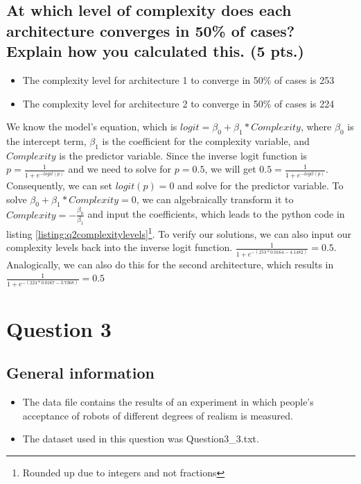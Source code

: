\documentclass[a4paper]{article}
\begin{document}
\subsection{At which level of complexity does each architecture converges in 50\% of cases? Explain how you calculated this. (5 pts.)}
\begin{itemize}
\centering
    \item The complexity level for architecture 1 to converge in 50\% of cases is 253
    \item The complexity level for architecture 2 to converge in 50\% of cases is 224
\end{itemize}
We know the model's equation, which is $logit = \beta_0 + \beta_1 * Complexity$, where $\beta_0$ is the intercept term, $\beta_1$ is the coefficient for the complexity variable, and $Complexity$ is the predictor variable. Since the inverse logit function is $p = \frac{1}{1 + e^{-logit(p)}}$ and we need to solve for $p = 0.5$, we will get $0.5 = \frac{1}{1 + e^{-logit(p)}}$. Consequently, we can set $logit(p) = 0$ and solve for the predictor variable. To solve $\beta_0 + \beta_1 * Complexity = 0$, we can algebraically transform it to $Complexity = -\frac{\beta_{0}}{\beta_{1}}$ and input the coefficients, which leads to the python code in listing \ref{listing:q2complexitylevels}\footnote{Rounded up due to integers and not fractions}. To verify our solutions, we can also input our complexity levels back into the inverse logit function. $\frac{1}{1 + e^{-(253 * 0.0164 - 4.1482)}} = 0.5$. Analogically, we can also do this for the second architecture, which results in $\frac{1}{1 + e^{-(224 * 0.0167 - 3.7368)}} = 0.5$
\section{Question 3}
\subsection{General information}
\begin{itemize}
\item The data file contains the results of an experiment in which people's acceptance of robots of different degrees of realism is measured.
    \item The dataset used in this question was Question3\_3.txt.
\end{itemize}
\end{document}
